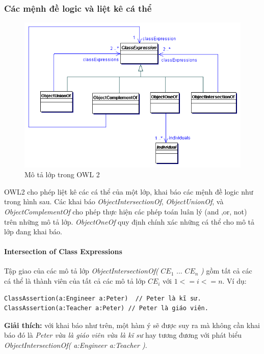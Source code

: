 \subsubsection{Các mệnh đề logic và liệt kê cá thể}
\begin{figure}[h]
	\centering
	\includegraphics[width=150mm]{Figures/ce_0.png}
	\caption{Mô tả lớp trong OWL 2\label{overflow}}
\end{figure}
OWL2 cho phép liệt kê các cá thể của một lớp, khai báo các mệnh đề logic như trong hình sau. Các khai báo \textit{ObjectIntersectionOf}, \textit{ObjectUnionOf}, và \textit{ObjectComplementOf} cho phép thực hiện các phép toán luân lý (and ,or, not) trên những mô tả lớp. \textit{ObjectOneOf} quy định chính xác những cá thể cho mô tả lớp đang khai báo.


\paragraph{Intersection of Class Expressions} Tập giao của các mô tả lớp \textit{ObjectIntersectionOf(} $CE_{1}$ ... $CE_{n}$ \textit{)} gồm tất cả các cá thể là thành viên của tất cả các mô tả lớp $CE_{i}$ với $1<=i<=n$. Ví dụ: 
\begin{verbatim}
ClassAssertion(a:Engineer a:Peter)  // Peter là kĩ sư.
ClassAssertion(a:Teacher a:Peter) // Peter là giáo viên.
\end{verbatim}
\textbf{Giải thích: } với khai báo như trên, một hàm ý sẽ được suy ra mà không cần khai báo đó là \textit{Peter vừa là giáo viên vừa là kĩ sư} hay tương đương với phát biểu \textit{ObjectIntersectionOf( a:Engineer a:Teacher )}. 

